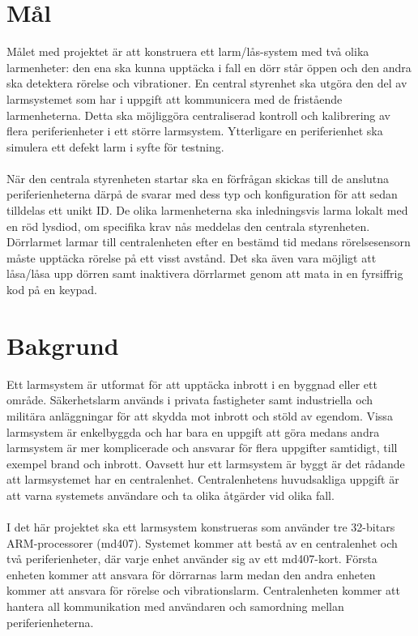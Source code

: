 \documentclass[a4paper]{article}
\begin{document}
\section{Mål}
Målet med projektet är att konstruera ett larm/lås-system med två olika larmenheter: den ena ska kunna upptäcka i fall en dörr står öppen och den andra ska detektera rörelse och vibrationer. En central styrenhet ska utgöra den del av larmsystemet som har i uppgift att kommunicera med de fristående larmenheterna. Detta ska möjliggöra centraliserad kontroll och kalibrering av flera periferienheter i ett större larmsystem. Ytterligare en periferienhet ska simulera ett defekt larm i syfte för testning.
\\\\
När den centrala styrenheten startar ska en förfrågan skickas till de anslutna periferienheterna därpå de svarar med dess typ och konfiguration för att sedan tilldelas ett unikt ID. De olika larmenheterna ska inledningsvis larma lokalt med en röd lysdiod, om specifika krav nås meddelas den centrala styrenheten. Dörrlarmet larmar till centralenheten efter en bestämd tid medans rörelsesensorn måste upptäcka rörelse på ett visst avstånd. Det ska även vara möjligt att låsa/låsa upp dörren samt inaktivera dörrlarmet genom att mata in en fyrsiffrig kod på en keypad.

\section{Bakgrund}
Ett larmsystem är utformat för att upptäcka inbrott i en byggnad eller ett område. Säkerhetslarm används i privata fastigheter samt industriella och militära anläggningar för att skydda mot inbrott och stöld av egendom. Vissa larmsystem är enkelbyggda och har bara en uppgift att göra medans andra larmsystem är mer komplicerade och ansvarar för flera uppgifter samtidigt, till exempel brand och inbrott. Oavsett hur ett larmsystem är byggt är det rådande att larmsystemet har en centralenhet. Centralenhetens huvudsakliga uppgift är att varna systemets användare och ta olika åtgärder vid olika fall.
\\\\
I det här projektet ska ett larmsystem konstrueras som använder tre 32-bitars ARM-processorer (md407). Systemet kommer att bestå av en centralenhet och två periferienheter, där varje enhet använder sig av ett md407-kort. Första enheten kommer att ansvara för dörrarnas larm medan den andra enheten kommer att ansvara för rörelse och vibrationslarm. Centralenheten kommer att hantera all kommunikation med användaren och samordning mellan periferienheterna.
\end{document}

